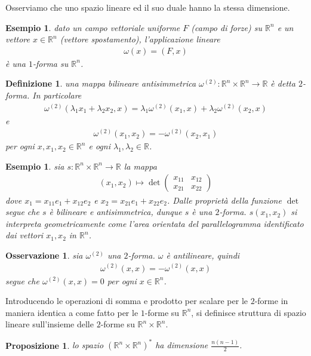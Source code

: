 \documentclass[oneside, 11pt]{amsbook}
\newcommand{\0}{{(0)}}
\newcommand{\3}{{(3)}}
\theoremstyle{colonplain}
\newtheorem{prop}[thm]{Proposizione}
\theoremstyle{colondefinition}
\newtheorem{defn}[thm]{Definizione}
\newtheorem{ex}[thm]{Esempio}
\theoremstyle{colonremark}
\newtheorem{rmk}[thm]{Osservazione}
\numberwithin{equation}{chapter}
\begin{document}
Osserviamo che uno spazio lineare ed il suo duale hanno la stessa dimensione.
\begin{ex} dato un campo vettoriale uniforme $F$ (campo di forze) su $\mathbb{R}^n$ e un vettore $x \in \mathbb{R}^n$ (vettore spostamento), l'applicazione lineare 
\begin{align}
    \omega(x) = (F, x) 
\end{align}
è una $1$-forma su $\mathbb{R}^n$.
\end{ex}
\begin{defn} una mappa bilineare antisimmetrica $\omega^{(2)} : \mathbb{R}^n \times \mathbb{R}^n \longrightarrow \mathbb{R}$ è detta $2$-\textit{forma}. In particolare 
\begin{align}
    \omega^{(2)}(\lambda_1x_1 + \lambda_2x_2, x) = \lambda_1\omega^{(2)}(x_1, x) + \lambda_2\omega^{(2)}(x_2, x) 
\end{align}
e
\begin{align}
    \omega^{(2)}(x_1, x_2) = -\omega^{(2)}(x_2, x_1)  
\end{align}
per ogni $x, x_1, x_2 \in \mathbb{R}^n$ e ogni $\lambda_1, \lambda_2 \in \mathbb{R}$.
\end{defn}
\begin{ex} sia $s : \mathbb{R}^n \times \mathbb{R}^n \longrightarrow \mathbb{R}$ la mappa 
\begin{align}
    (x_1, x_2) \mapsto \det
    \begin{pmatrix}
        x_{11} & x_{12} \\
        x_{21} & x_{22}
    \end{pmatrix} 
\end{align}
dove $x_1 = x_{11}e_1 + x_{12}e_2$ e $x_2 = x_{21}e_1 + x_{22}e_2$. Dalle proprietà della funzione $\det$ segue che $s$ è bilineare e antisimmetrica, dunque $s$ è una $2$-forma. $s(x_1, x_2)$ si interpreta geometricamente come l'area orientata del parallelogramma identificato dai vettori $x_1, x_2$ in $\mathbb{R}^n$.
\end{ex}
\begin{rmk} sia $\omega^{(2)}$ una $2$-forma. $\omega$ è antilineare, quindi
\begin{align}
    \omega^{(2)}(x, x) = -\omega^{(2)}(x, x)
\end{align}
segue che $\omega^{(2)}(x, x) = 0$ per ogni $x \in \mathbb{R}^n$.
\end{rmk}
Introducendo le operazioni di somma e prodotto per scalare per le $2$-forme in maniera identica a come fatto per le $1$-forme su $\mathbb{R}^n$, si definisce struttura di spazio lineare sull'insieme delle $2$-forme su $\mathbb{R}^n \times \mathbb{R}^n$.
\begin{prop}\label{R^n x R^n DualDim} lo spazio $(\mathbb{R}^n \times \mathbb{R}^n)^*$ ha dimensione $\frac{n(n - 1)}{2}$.
\end{prop}
\end{document}
